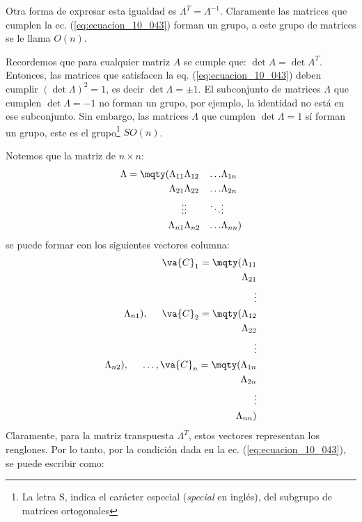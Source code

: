 Otra forma de expresar esta igualdad es $\Lambda^{T} = \Lambda^{-1}$. Claramente las matrices que cumplen la ec. (\ref{eq:ecuacion_10_043}) forman un grupo, a este grupo de matrices se le llama $O(n)$.
\par
Recordemos que para cualquier matriz $A$ se cumple que: $\det A = \det A^{T}$. Entonces, las matrices que satisfacen la eq. (\ref{eq:ecuacion_10_043}) deben cumplir $(\det \Lambda)^{2} = 1$, es decir $\det \Lambda = \pm 1$. El subconjunto de matrices $\Lambda$ que cumplen $\det \Lambda = - 1$ no forman un grupo, por ejemplo, la identidad no está en ese subconjunto. Sin embargo, las matrices $\Lambda$ que cumplen $\det \Lambda = 1$ sí forman un grupo, este es el grupo\footnote{La letra S, indica el carácter especial (\emph{special} en inglés), del subgrupo de matrices ortogonales} $SO(n)$.
\par
Notemos que la matriz de $n \times n$:
\begin{align}
\Lambda = \mqty(\Lambda_{11} & \Lambda_{12} & \ldots & \Lambda_{1n} \\ \Lambda_{21} & \Lambda_{22} & \ldots & \Lambda_{2n} \\ \vdots & \vdots & \ddots & \vdots \\ \Lambda_{n1} & \Lambda_{n2} & \ldots & \Lambda_{nn})
\label{eq:ecuacion_10_44}
\end{align}
se puede formar con los siguientes vectores columna:
\begin{align}
\va{C}_{1} = \mqty(\Lambda_{11} \\ \Lambda_{21} \\ \vdots \\ \Lambda_{n1}), \hspace{0.5cm} \va{C}_{2} = \mqty(\Lambda_{12} \\ \Lambda_{22} \\ \vdots \\ \Lambda_{n2}), \hspace{0.5cm} \ldots, \va{C}_{n} = \mqty(\Lambda_{1n} \\ \Lambda_{2n} \\ \vdots \\ \Lambda_{nn})
\label{eq:ecuacion_10_045}
\end{align}
Claramente, para la matriz transpuesta $\Lambda^{T}$, estos vectores representan los renglones. Por lo tanto, por la condición dada en la ec. (\ref{eq:ecuacion_10_043}), se puede escribir como:
